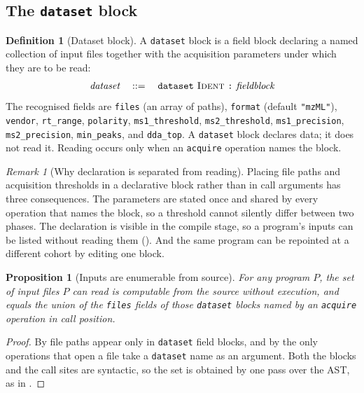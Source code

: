 \documentclass[11pt,twocolumn,a4paper]{article}
\theoremstyle{ssthm}
\newtheorem{proposition}[theorem]{Proposition}
\theoremstyle{definition}
\newtheorem{definition}[theorem]{Definition}
\theoremstyle{remark}
\newtheorem{remark}[theorem]{Remark}
\newcommand{\bnf}{\;::=\;}
\newcommand{\shk}[1]{\texttt{#1}}
\newcommand{\Prog}{P}
\begin{document}
\subsection{The \shk{dataset} block}

\begin{definition}[Dataset block]
\label{def:dataset}
A \shk{dataset} block is a field block declaring a named collection of
input files together with the acquisition parameters under which they are
to be read:
\[
\begin{array}{rcl}
\textit{dataset} &\bnf& \shk{dataset}\ \textsc{Ident}\ \shk{:}\ \textit{fieldblock}
\end{array}
\]
The recognised fields are \shk{files} (an array of paths), \shk{format}
(default \shk{"mzML"}), \shk{vendor}, \shk{rt\_range}, \shk{polarity},
\shk{ms1\_threshold}, \shk{ms2\_threshold}, \shk{ms1\_precision},
\shk{ms2\_precision}, \shk{min\_peaks}, and \shk{dda\_top}. A
\shk{dataset} block declares data; it does not read it. Reading occurs
only when an \shk{acquire} operation names the block.
\end{definition}

\begin{remark}[Why declaration is separated from reading]
\label{rem:decl-vs-read}
Placing file paths and acquisition thresholds in a declarative block
rather than in call arguments has three consequences. The parameters are
stated once and shared by every operation that names the block, so a
threshold cannot silently differ between two phases. The declaration is
visible in the compile stage, so a program's inputs can be listed
without reading them (). And the same
program can be repointed at a different cohort by editing one block.
\end{remark}

\begin{proposition}[Inputs are enumerable from source]
\label{prop:inputs-enumerable}
For any program $\Prog$, the set of input files $\Prog$ can read is
computable from the source without execution, and equals the union of
the \shk{files} fields of those \shk{dataset} blocks named by an
\shk{acquire} operation in call position.
\end{proposition}

\begin{proof}
By  file paths appear only in \shk{dataset} field
blocks, and by  the only operations that open a
file take a \shk{dataset} name as an argument. Both the blocks and the
call sites are syntactic, so the set is obtained by one pass over the
AST, as in .
\end{proof}
\end{document}
